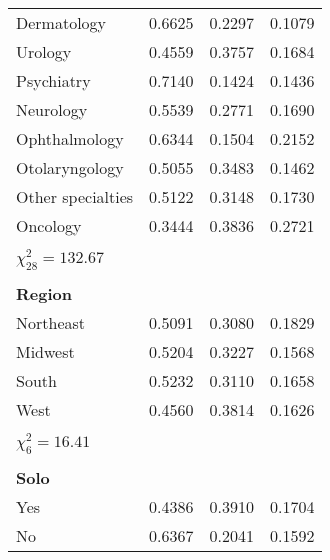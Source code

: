\documentclass[11pt, oneside]{article}        %
\begin{document}
\begin{longtable}[h]
\begin{tabular}{llll}
Dermatology                            & 0.6625   & 0.2297     & 0.1079     \\
Urology                                & 0.4559   & 0.3757     & 0.1684     \\
Psychiatry                             & 0.7140   & 0.1424     & 0.1436     \\
Neurology                              & 0.5539   & 0.2771     & 0.1690     \\
Ophthalmology                          & 0.6344   & 0.1504     & 0.2152     \\
Otolaryngology                         & 0.5055   & 0.3483     & 0.1462     \\
Other specialties                      & 0.5122   & 0.3148     & 0.1730     \\
Oncology                               & 0.3444   & 0.3836     & 0.2721     \\
                                       &          &            &            \\
$\chi^2_{28} = 132.67$                 &          &            &            \\
                                       &          &            &            \\
\textbf{Region}                        &          &            &            \\
Northeast                              & 0.5091   & 0.3080     & 0.1829     \\
Midwest                                & 0.5204   & 0.3227     & 0.1568     \\
South                                  & 0.5232   & 0.3110     & 0.1658     \\
West                                   & 0.4560   & 0.3814     & 0.1626     \\
                                       &          &            &            \\
$\chi^2_6 = 16.41$                     &          &            &            \\
                                       &          &            &            \\
\textbf{Solo}                          &          &            &            \\
Yes                                    & 0.4386   & 0.3910     & 0.1704     \\
No                                     & 0.6367   & 0.2041     & 0.1592     \\

\end{tabular}
\end{longtable}
\end{document}
